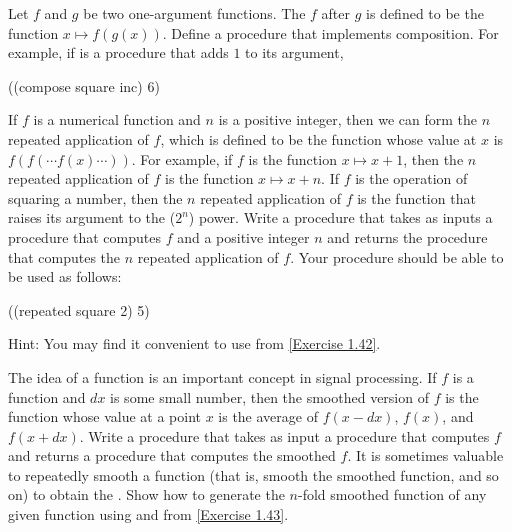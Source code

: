 \begin{exercise}
	\label{Exercise 1.42}
	Let \( f \) and \( g \) be two one-argument functions.
	The  \( f \) after \( g \) is defined to be the function \( x \mapsto f(g(x)) \).
	Define a procedure  that implements composition.
	For example, if  is a procedure that adds \( 1 \) to its argument,
	\begin{scheme}
	  ((compose square inc) 6)
	  ~~
	\end{scheme}
\end{exercise}



\begin{exercise}
	\label{Exercise 1.43}
	If \( f \) is a numerical function and \( n \) is a positive integer, then we can form the \( n \) repeated application of \( f \), which is defined to be the function whose value at \( x \) is \( f(f( \dotsb f(x) \dotsb )) \).
	For example, if \( f \) is the function \( x \mapsto x + 1 \), then the \( n \) repeated application of \( f \) is the function \( x \mapsto x + n \).
	If \( f \) is the operation of squaring a number, then the \( n \) repeated application of \( f \) is the function that raises its argument to the (\( 2^n \)) power.
	Write a procedure  that takes as inputs a procedure that computes \( f \) and a positive integer \( n \) and returns the procedure that computes the \( n \) repeated application of \( f \).
	Your procedure should be able to be used as follows:
	\begin{scheme}
	  ((repeated square 2) 5)
	  ~\outprint{625}~
	\end{scheme}
	Hint:
	You may find it convenient to use  from \cref{Exercise 1.42}.
\end{exercise}



\begin{exercise}
	\label{Exercise 1.44}
	The idea of  a function is an important concept in signal processing.
	If \( f \) is a function and \( dx \) is some small number, then the smoothed version of \( f \) is the function whose value at a point \( x \) is the average of \( f(x - dx) \), \( f(x) \), and \( f(x + dx) \).
	Write a procedure  that takes as input a procedure that computes \( f \) and returns a procedure that computes the smoothed \( f \).
	It is sometimes valuable to repeatedly smooth a function (that is, smooth the smoothed function, and so on) to obtain the .
	Show how to generate the \( n \)-fold smoothed function of any given function using  and  from \cref{Exercise 1.43}.
\end{exercise}



